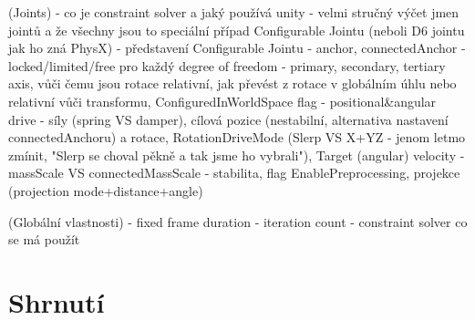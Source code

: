 (Joints)
- co je constraint solver a jaký používá unity
- velmi stručný výčet jmen jointů a že všechny jsou to speciální případ Configurable Jointu (neboli D6 jointu jak ho zná PhysX)
- představení Configurable Jointu
    - anchor, connectedAnchor
    - locked/limited/free pro každý degree of freedom
    - primary, secondary, tertiary axis, vůči čemu jsou rotace relativní, jak převést z rotace v globálním úhlu nebo relativní vůči transformu, ConfiguredInWorldSpace flag
    - positional\&angular drive - síly (spring VS damper), cílová pozice (nestabilní, alternativa nastavení connectedAnchoru) a rotace, RotationDriveMode (Slerp VS X+YZ - jenom letmo zmínit, "Slerp se choval pěkně a tak jsme ho vybrali"), Target (angular) velocity
    - massScale VS connectedMassScale
    - stabilita, flag EnablePreprocessing, projekce (projection mode+distance+angle)

(Globální vlastnosti)
- fixed frame duration
- iteration count
- constraint solver co se má použít


\section{Shrnutí}